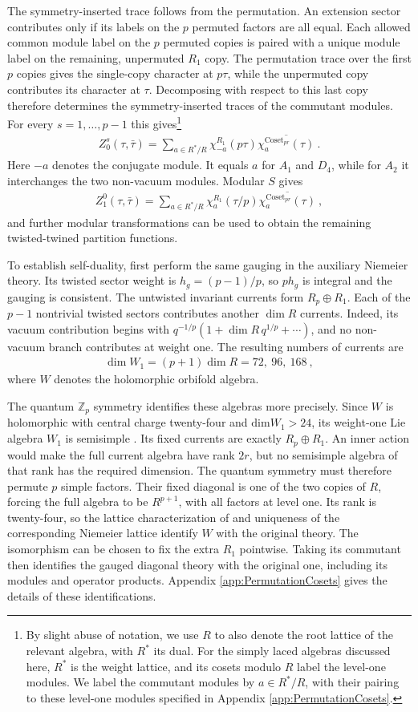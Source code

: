 \documentclass[12pt]{article}
\numberwithin{equation}{section}
\newcommand{\bea}{\begin{eqnarray}}
\newcommand{\eea}{\end{eqnarray}}
\def\ZZ{\mathbb{Z}}
\theoremstyle{remark}
\begin{document}
The symmetry-inserted trace follows from the permutation. An extension sector contributes only if its labels on the $p$ permuted factors are all equal. Each allowed common module label on the $p$ permuted copies is paired with a unique module label on the remaining, unpermuted $R_1$ copy. The permutation trace over the first $p$ copies gives the single-copy character at $p\tau$, while the unpermuted copy contributes its character at $\tau$. Decomposing with respect to this last copy therefore determines the symmetry-inserted traces of the commutant modules. 
For every $s=1,\ldots,p-1$ this gives\footnote{By slight abuse of notation, we use $R$ to also denote the root lattice of the relevant algebra, with $R^*$ its dual. For the simply laced algebras discussed here, $R^*$ is the weight lattice, and its cosets modulo $R$ label the level-one modules. We label the commutant modules by $a\in R^*/R$, with their pairing to these level-one modules specified in Appendix \ref{app:PermutationCosets}.}
\bea \label{eq:PermutationCosetInsertion}
Z^s_0(\tau,\bar\tau)=\sum_{a\in R^*/R}\chi^{R_1}_{-a}(p\tau)\overline{\chi^{\mathrm{Coset}_{pr}}_a(\tau)}~.
\eea
Here $-a$ denotes the conjugate module. It equals $a$ for $A_1$ and $D_4$, while for $A_2$ it interchanges the two non-vacuum modules. Modular $S$ gives
\bea \label{eq:PermutationCosetSpatial}
Z^0_1(\tau,\bar\tau)=\sum_{a\in R^*/R}\chi^{R_1}_a(\tau/p)\overline{\chi^{\mathrm{Coset}_{pr}}_a(\tau)}~,
\eea
and further modular transformations can be used to obtain the remaining twisted-twined partition functions. 


To establish self-duality, first perform the same gauging in the auxiliary Niemeier theory. Its twisted sector weight is $h_g=(p-1)/p$, so $p h_g$ is integral and the gauging is consistent. The untwisted invariant currents form $R_p\oplus R_1$. Each of the $p-1$ nontrivial twisted sectors contributes another $\dim R$ currents. Indeed, its vacuum contribution begins with $q^{-1/p}(1+\dim R\,q^{1/p}+\cdots)$, and no non-vacuum branch contributes at weight one. The resulting numbers of currents are
\bea 
\dim W_1=(p+1)\dim R=72,\ 96,\ 168~,
\eea
where $W$ denotes the holomorphic orbifold algebra.

The quantum $\ZZ_p$ symmetry identifies these algebras more precisely. Since $W$ is holomorphic with central charge twenty-four and $\mathrm{dim} W_1>24$, its weight-one Lie algebra $W_1$ is semisimple \cite{dong2004holomorphic}. Its fixed currents are exactly $R_p\oplus R_1$. An inner action would make the full current algebra have rank $2r$, but no semisimple algebra of that rank has the required dimension. The quantum symmetry must therefore permute $p$ simple factors. Their fixed diagonal is one of the two copies of $R$, forcing the full algebra to be $R^{p+1}$, with all factors at level one. Its rank is twenty-four, so the lattice characterization of \cite{Dong:2002fs} and uniqueness of the corresponding Niemeier lattice identify $W$ with the original theory. The isomorphism can be chosen to fix the extra $R_1$ pointwise. Taking its commutant then identifies the gauged diagonal theory with the original one, including its modules and operator products. Appendix \ref{app:PermutationCosets} gives the details of these identifications.
\end{document}

